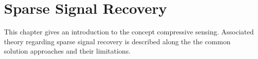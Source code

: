 \chapter{Sparse Signal Recovery}
This chapter gives an introduction to the concept compressive sensing. Associated theory regarding sparse signal recovery is described along the  the common solution approaches and their limitations. 
    







